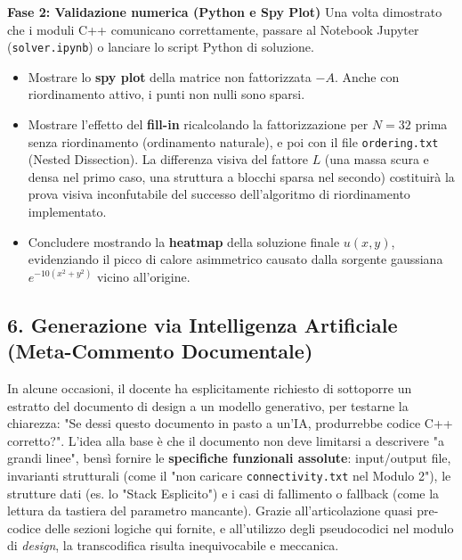 \documentclass[a4paper,11pt]{article}
\theoremstyle{definition}
\begin{document}
\textbf{Fase 2: Validazione numerica (Python e Spy Plot)}
Una volta dimostrato che i moduli C++ comunicano correttamente, passare al Notebook Jupyter (\texttt{solver.ipynb}) o lanciare lo script Python di soluzione.
\begin{itemize}
    \item Mostrare lo \textbf{spy plot} della matrice non fattorizzata $-A$. Anche con riordinamento attivo, i punti non nulli sono sparsi.
    \item Mostrare l'effetto del \textbf{fill-in} ricalcolando la fattorizzazione per $N=32$ prima senza riordinamento (ordinamento naturale), e poi con il file \texttt{ordering.txt} (Nested Dissection). La differenza visiva del fattore $L$ (una massa scura e densa nel primo caso, una struttura a blocchi sparsa nel secondo) costituirà la prova visiva inconfutabile del successo dell'algoritmo di riordinamento implementato.
    \item Concludere mostrando la \textbf{heatmap} della soluzione finale $u(x,y)$, evidenziando il picco di calore asimmetrico causato dalla sorgente gaussiana $e^{-10(x^2+y^2)}$ vicino all'origine.
\end{itemize}

\subsection{6. Generazione via Intelligenza Artificiale (Meta-Commento Documentale)}
In alcune occasioni, il docente ha esplicitamente richiesto di sottoporre un estratto del documento di design a un modello generativo, per testarne la chiarezza: "Se dessi questo documento in pasto a un'IA, produrrebbe codice C++ corretto?".
L'idea alla base è che il documento non deve limitarsi a descrivere "a grandi linee", bensì fornire le \textbf{specifiche funzionali assolute}: input/output file, invarianti strutturali (come il "non caricare \texttt{connectivity.txt} nel Modulo 2"), le strutture dati (es. lo "Stack Esplicito") e i casi di fallimento o fallback (come la lettura da tastiera del parametro mancante). Grazie all'articolazione quasi pre-codice delle sezioni logiche qui fornite, e all'utilizzo degli pseudocodici nel modulo di \textit{design}, la transcodifica risulta inequivocabile e meccanica.


\end{document}
